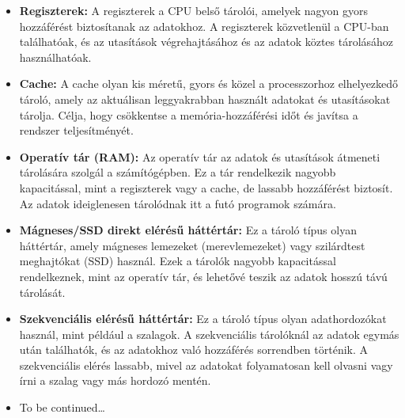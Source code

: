 \documentclass[11pt,a4paper]{article}
\begin{document}
            \begin{tcolorbox}[colback=blue!5!white,colframe=blue!50!black,title= 13. Ismertesse a tárolók hierarchia szintjeit!]
                \begin{itemize}
                    \item \textbf{Regiszterek:} A regiszterek a CPU belső tárolói, amelyek nagyon gyors hozzáférést biztosítanak az adatokhoz. A regiszterek közvetlenül a CPU-ban találhatóak, és az utasítások végrehajtásához és az adatok köztes tárolásához használhatóak.
                    \item \textbf{Cache:} A cache olyan kis méretű, gyors és közel a processzorhoz elhelyezkedő tároló, amely az aktuálisan leggyakrabban használt adatokat és utasításokat tárolja. Célja, hogy csökkentse a memória-hozzáférési időt és javítsa a rendszer teljesítményét.
                    \item \textbf{Operatív tár (RAM):} Az operatív tár az adatok és utasítások átmeneti tárolására szolgál a számítógépben. Ez a tár rendelkezik nagyobb kapacitással, mint a regiszterek vagy a cache, de lassabb hozzáférést biztosít. Az adatok ideiglenesen tárolódnak itt a futó programok számára.
                    \item \textbf{Mágneses/SSD direkt elérésű háttértár:} Ez a tároló típus olyan háttértár, amely mágneses lemezeket (merevlemezeket) vagy szilárdtest meghajtókat (SSD) használ. Ezek a tárolók nagyobb kapacitással rendelkeznek, mint az operatív tár, és lehetővé teszik az adatok hosszú távú tárolását.
                    \item \textbf{Szekvenciális elérésű háttértár:} Ez a tároló típus olyan adathordozókat használ, mint például a szalagok. A szekvenciális tárolóknál az adatok egymás után találhatók, és az adatokhoz való hozzáférés sorrendben történik. A szekvenciális elérés lassabb, mivel az adatokat folyamatosan kell olvasni vagy írni a szalag vagy más hordozó mentén.
                \end{itemize}
            \end{tcolorbox}
            
            \begin{tcolorbox}[colback=blue!5!white,colframe=blue!50!black,title= 14. Ismertesse a CPU részeit és működését egy utasítás végrehajtási folyamatában!]
                \begin{itemize}
                    \item To be continued…
                \end{itemize}
            \end{tcolorbox}
            
\end{document}
